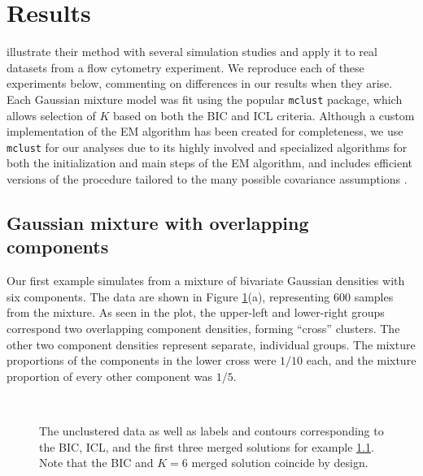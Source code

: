 \documentclass{uwstat572}
\renewcommand\;{\,}
\begin{document}
\section{Results}
\cite{Baudry10} illustrate their method with several simulation studies and apply it to real datasets from a flow cytometry experiment.
We reproduce each of these experiments below, commenting on differences in our results when they arise.
Each Gaussian mixture model was fit using the popular \texttt{mclust} package, which allows selection of $K$ based on both the BIC and ICL criteria.
Although a custom implementation of the EM algorithm has been created for completeness, we use \texttt{mclust} for our analyses due to its highly involved and specialized algorithms for both the initialization and main steps of the EM algorithm, and includes efficient versions of the procedure tailored to the many possible covariance assumptions \citep{Scrucca16, Fraley96}.

\subsection{Gaussian mixture with overlapping components}\label{one}
Our first example simulates from a mixture of bivariate Gaussian densities with six components.
The data are shown in Figure \ref{Example1}(a), representing 600 samples from the mixture.
As seen in the plot, the upper-left and lower-right groups correspond two overlapping component densities, forming ``cross'' clusters.
The other two component densities represent separate, individual groups.
The mixture proportions of the components in the lower cross were $1/10$ each, and the mixture proportion of every other component was $1/5$. 

\begin{figure}
\begin{center}
\\
\end{center}
\caption{
The unclustered data as well as labels and contours corresponding to the BIC, ICL, and the first three merged solutions for example \ref{one}. Note that the BIC and $K = 6$ merged solution coincide by design.
}
\label{Example1}
\end{figure}
\end{document}
